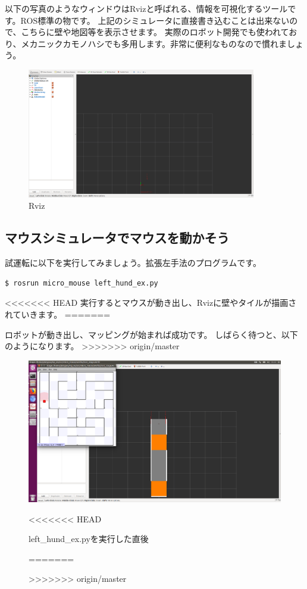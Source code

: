 \documentclass[11pt,a4paper]{jsarticle}
\begin{document}
以下の写真のようなウィンドウはRvizと呼ばれる、情報を可視化するツールです。ROS標準の物です。
上記のシミュレータに直接書き込むことは出来ないので、こちらに壁や地図等を表示させます。
実際のロボット開発でも使われており、メカニックカモノハシでも多用します。非常に便利なものなので慣れましょう。
\begin{figure}[h]
  \begin{center}
    \includegraphics[width=100mm]{./mms_rviz.png}
  \end{center}
  \label{mms_simulator}
  \caption{Rviz}
\end{figure}



\subsection{マウスシミュレータでマウスを動かそう}

試運転に以下を実行してみましょう。拡張左手法のプログラムです。
\begin{lstlisting}[frame=single]
$ rosrun micro_mouse left_hund_ex.py
\end{lstlisting}

<<<<<<< HEAD
実行するとマウスが動き出し、Rvizに壁やタイルが描画されていきます。
=======

ロボットが動き出し、マッピングが始まれば成功です。
しばらく待つと、以下のようになります。
>>>>>>> origin/master
\begin{figure}[h]
  \begin{center}
    \includegraphics[width=128mm]{./mms_test_pause.png}
  \end{center}
<<<<<<< HEAD
  \label{mms_simulator}
  \caption{left\_hund\_ex.pyを実行した直後}
=======
  \caption{}
  \label{test}
>>>>>>> origin/master
\end{figure}
\end{document}

